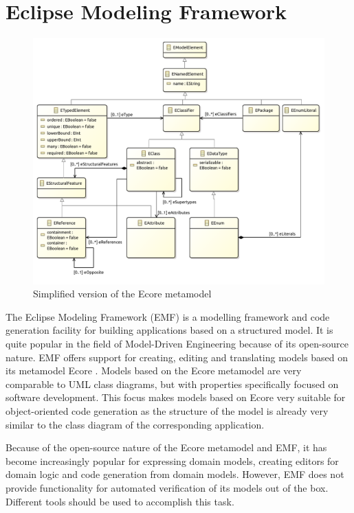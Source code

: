 \section{Eclipse Modeling Framework}
\label{sec:background:eclipse_modeling_framework}

\begin{figure}[p]
    \centering
    \includegraphics[width=\textwidth]{images/03_formalisations/02_ecore_formalisation/ecore.pdf}
    \caption{Simplified version of the Ecore metamodel}
    \label{fig:formalisations:ecore_formalisation:ecore}
\end{figure}

The Eclipse Modeling Framework (EMF) \cite{emf-gronback} is a modelling framework and code generation facility for building applications based on a structured model. It is quite popular in the field of Model-Driven Engineering because of its open-source nature. EMF offers support for creating, editing and translating models based on its metamodel Ecore \cite{bacvanski_graff_2005}. Models based on the Ecore metamodel are very comparable to UML class diagrams, but with properties specifically focused on software development. This focus makes models based on Ecore very suitable for object-oriented code generation as the structure of the model is already very similar to the class diagram of the corresponding application.

Because of the open-source nature of the Ecore metamodel and EMF, it has become increasingly popular for expressing domain models, creating editors for domain logic and code generation from domain models. However, EMF does not provide functionality for automated verification of its models out of the box. Different tools should be used to accomplish this task.

